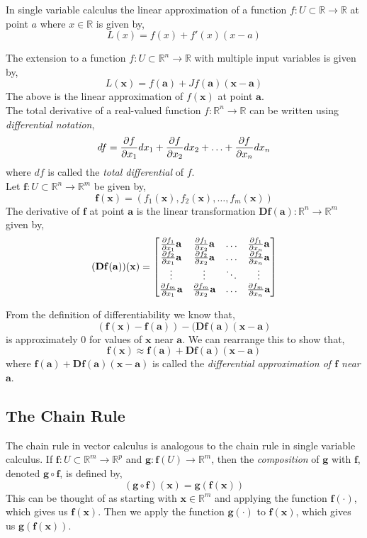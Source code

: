 \documentclass[12pt]{article}
\begin{document}
 In single variable calculus the linear approximation of a function $f:U\subset\mathbb{R}\rightarrow\mathbb{R}$ at point $a$ where $x\in\mathbb{R}$ is given by,
\[
L(x) = f(x) + f'(x)(x-a)
\]

The extension to a function $f:U\subset\mathbb{R}^n\rightarrow\mathbb{R}$ with multiple input variables is given by,
\[
L(\mathbf{x}) = f(\mathbf{a}) + Jf(\mathbf{a})(\mathbf{x}-\mathbf{a})
\]
The above is the linear approximation of $f(\mathbf{x})$ at point $\mathbf{a}$. \\

 The total derivative of a real-valued function $f:\mathbb{R}^n\rightarrow\mathbb{R}$  can be written using \emph{differential notation},
\[
df = \frac{\partial f}{\partial x_1}dx_1 + \frac{\partial f}{\partial x_2}dx_2 + \ldots + \frac{\partial f}{\partial x_n}dx_n
\]
where $df$ is called the \emph{total differential} of $f$. \\

 Let $\mathbf{f}:U\subset\mathbb{R}^n\rightarrow\mathbb{R}^m$ be given by,
\[
\mathbf{f}(\mathbf{x}) = (f_1(\mathbf{x}),f_2(\mathbf{x}),\ldots,f_m(\mathbf{x}))
\]
The derivative of $\mathbf{f}$ at point $\mathbf{a}$ is the linear transformation $\mathbf{Df(a)}:\mathbb{R}^n\rightarrow\mathbb{R}^m$ given by,
\[
\mathbf{(Df(a))(x)} = 
\begin{bmatrix}
\frac{\partial f_1}{\partial x_1}\mathbf{a} & \frac{\partial f_1}{\partial x_2}\mathbf{a} & \ldots & \frac{\partial f_1}{\partial x_n}\mathbf{a} \\
\frac{\partial f_2}{\partial x_1}\mathbf{a} & \frac{\partial f_2}{\partial x_2}\mathbf{a} & \ldots & \frac{\partial f_2}{\partial x_n}\mathbf{a} \\
\vdots & \vdots & \ddots & \vdots \\
\frac{\partial f_m}{\partial x_1}\mathbf{a} & \frac{\partial f_m}{\partial x_2}\mathbf{a} & \ldots & \frac{\partial f_m}{\partial x_n}\mathbf{a} \\
\end{bmatrix}
\]

From the definition of differentiability we know that,
\[
\mathbf{(f(x)-f(a))-(Df(a)(x-a)}
\]
is approximately 0 for values of $\mathbf{x}$ near $\mathbf{a}$. We can rearrange this to show that,
\[
\mathbf{f(x)\approx f(a) + Df(a)(x-a)}
\]
where $\mathbf{f(a) + Df(a)(x-a)}$ is called the \emph{differential approximation of $\mathbf{f}$ near $\mathbf{a}$}. \\

\subsection{The Chain Rule}

The chain rule in vector calculus is analogous to the chain rule in single variable calculus. If $\mathbf{f}:U\subset\mathbb{R}^m\rightarrow\mathbb{R}^p$ and $\mathbf{g}:\mathbf{f}(U)\rightarrow\mathbb{R}^m$, then the \emph{composition} of $\mathbf{g}$ with $\mathbf{f}$, denoted $\mathbf{g}\circ\mathbf{f}$, is defined by,
\[
(\mathbf{g}\circ\mathbf{f})(\mathbf{x}) = \mathbf{g(f(x))}
\]
This can be thought of as starting with $\mathbf{x}\in\mathbb{R}^m$ and applying the function $\mathbf{f}(\cdot)$, which gives us $\mathbf{f(x)}$. Then we apply the function $\mathbf{g}(\cdot)$ to $\mathbf{f(x)}$, which gives us $\mathbf{g(f(x))}$. \\
\end{document}
